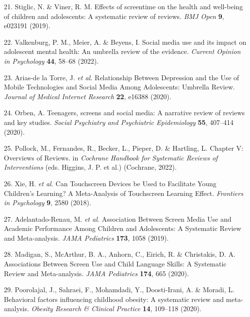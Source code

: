 \documentclass[
  english,
  man]{apa6}
\newenvironment{cslreferences}%
  {}%
  {\par}
\begin{document}
\begin{cslreferences}
\leavevmode\hypertarget{ref-stiglicEffectsScreentimeHealth2019}{}%
21. Stiglic, N. \& Viner, R. M. Effects of screentime on the health and well-being of children and adolescents: A systematic review of reviews. \emph{BMJ Open} \textbf{9}, e023191 (2019).

\leavevmode\hypertarget{ref-valkenburgSocialMediaUse2022}{}%
22. Valkenburg, P. M., Meier, A. \& Beyens, I. Social media use and its impact on adolescent mental health: An umbrella review of the evidence. \emph{Current Opinion in Psychology} \textbf{44}, 58--68 (2022).

\leavevmode\hypertarget{ref-arias-delatorreRelationshipDepressionUse2020}{}%
23. Arias-de la Torre, J. \emph{et al.} Relationship Between Depression and the Use of Mobile Technologies and Social Media Among Adolescents: Umbrella Review. \emph{Journal of Medical Internet Research} \textbf{22}, e16388 (2020).

\leavevmode\hypertarget{ref-orbenTeenagersScreensSocial2020}{}%
24. Orben, A. Teenagers, screens and social media: A narrative review of reviews and key studies. \emph{Social Psychiatry and Psychiatric Epidemiology} \textbf{55}, 407--414 (2020).

\leavevmode\hypertarget{ref-pollockChapterOverviewsReviews2022}{}%
25. Pollock, M., Fernandes, R., Becker, L., Pieper, D. \& Hartling, L. Chapter V: Overviews of Reviews. in \emph{Cochrane Handbook for Systematic Reviews of Interventions} (eds. Higgins, J. P. et al.) (Cochrane, 2022).

\leavevmode\hypertarget{ref-xieCanTouchscreenDevices2018}{}%
26. Xie, H. \emph{et al.} Can Touchscreen Devices be Used to Facilitate Young Children's Learning? A Meta-Analysis of Touchscreen Learning Effect. \emph{Frontiers in Psychology} \textbf{9}, 2580 (2018).

\leavevmode\hypertarget{ref-adelantado-renauAssociationScreenMedia2019}{}%
27. Adelantado-Renau, M. \emph{et al.} Association Between Screen Media Use and Academic Performance Among Children and Adolescents: A Systematic Review and Meta-analysis. \emph{JAMA Pediatrics} \textbf{173}, 1058 (2019).

\leavevmode\hypertarget{ref-madiganAssociationsScreenUse2020}{}%
28. Madigan, S., McArthur, B. A., Anhorn, C., Eirich, R. \& Christakis, D. A. Associations Between Screen Use and Child Language Skills: A Systematic Review and Meta-analysis. \emph{JAMA Pediatrics} \textbf{174}, 665 (2020).

\leavevmode\hypertarget{ref-poorolajalBehavioralFactorsInfluencing2020}{}%
29. Poorolajal, J., Sahraei, F., Mohamdadi, Y., Doosti-Irani, A. \& Moradi, L. Behavioral factors influencing childhood obesity: A systematic review and meta-analysis. \emph{Obesity Research \& Clinical Practice} \textbf{14}, 109--118 (2020).


\end{cslreferences}
\end{document}
